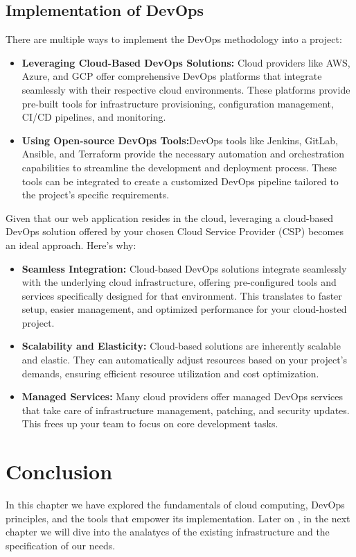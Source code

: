 \subsection{Implementation of DevOps}
There are multiple ways to implement the DevOps methodology into a project:
\begin{itemize}
    \item \textbf{Leveraging Cloud-Based DevOps Solutions:}     Cloud providers like AWS, Azure, and GCP offer comprehensive DevOps platforms that integrate seamlessly with their respective cloud environments. These platforms provide pre-built tools for infrastructure provisioning, configuration management, CI/CD pipelines, and monitoring.
    \item \textbf{Using Open-source DevOps Tools:}DevOps tools like Jenkins, GitLab, Ansible, and Terraform provide the necessary automation and orchestration capabilities to streamline the development and deployment process. These tools can be integrated to create a customized DevOps pipeline tailored to the project's specific requirements.
\end{itemize}
Given that our web application resides in the cloud, leveraging a cloud-based DevOps solution offered by your chosen Cloud Service Provider (CSP) becomes an ideal approach. Here's why:
\begin{itemize}
    \item \textbf{Seamless Integration:} Cloud-based DevOps solutions integrate seamlessly with the underlying cloud infrastructure, offering pre-configured tools and services specifically designed for that environment. This translates to faster setup, easier management, and optimized performance for your cloud-hosted project.
    \item \textbf{Scalability and Elasticity:} Cloud-based solutions are inherently scalable and elastic. They can automatically adjust resources based on your project's demands, ensuring efficient resource utilization and cost optimization.
    \item \textbf{Managed Services:} Many cloud providers offer managed DevOps services that take care of infrastructure management, patching, and security updates. This frees up your team to focus on core development tasks.
\end{itemize}

\section*{Conclusion}
In this chapter we have explored the fundamentals of cloud computing, DevOps principles, and the tools that empower its implementation. Later on , in the next chapter we will dive into the analatycs of the existing infrastructure and the specification of our needs.
